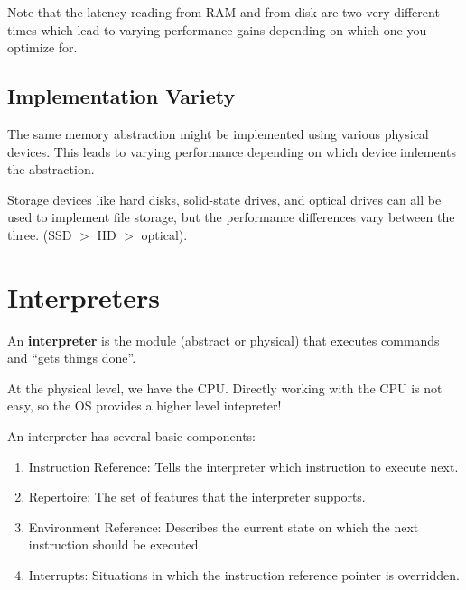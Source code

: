 \documentclass{report}
\begin{document}
Note that the latency reading from RAM and from disk are two very different times which lead to
varying performance gains depending on which one you optimize for.


\subsection*{Implementation Variety}
The same memory abstraction might be implemented using various physical devices. This leads to
varying performance depending on which device imlements the abstraction.

\begin{tcolorbox}[colback=blue!5!white,colframe=black!75!blue,title=Example: Caught in 4k] 
  Storage devices like hard disks, solid-state drives, and optical drives can all be used to
  implement file storage, but the performance differences vary between the three. (SSD $>$
  HD $>$ optical).
\end{tcolorbox}





\section{Interpreters}

\begin{tcolorbox}[title=Definition: Persistent and Transient Memory]
  An \textbf{interpreter} is the module (abstract or physical) that executes commands and ``gets
  things done''.
\end{tcolorbox}

\begin{tcolorbox}[colback=violet!5!white,colframe=violet,title=Abstraction: Interpreters] 
  At the physical level, we have the CPU. Directly working with the CPU is not easy, so the OS
  provides a higher level intepreter!
\end{tcolorbox}

An interpreter has several basic components: 
\begin{enumerate}[label=\textit{(\roman*)}]
\item Instruction Reference: Tells the interpreter which instruction to execute next.
\item Repertoire: The set of features that the interpreter supports.
\item Environment Reference: Describes the current state on which the next instruction should be
  executed.
\item Interrupts: Situations in which the instruction reference pointer is overridden.
\end{enumerate}
\end{document}
